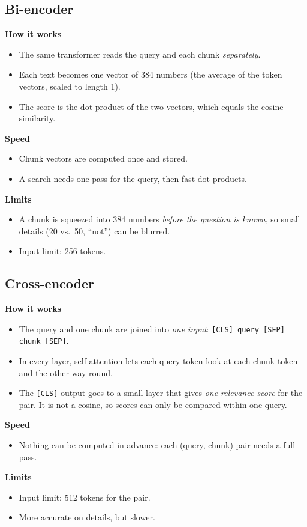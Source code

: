 \documentclass[10pt,a4paper]{article}
\newcommand{\code}[1]{\texttt{#1}}
\begin{document}
\subsection*{Bi-encoder}
\textbf{How it works}
\begin{itemize}
\item The same transformer reads the query and each chunk \emph{separately}.
\item Each text becomes one vector of 384 numbers (the average of the token vectors, scaled to length 1).
\item The score is the dot product of the two vectors, which equals the cosine similarity.
\end{itemize}
\textbf{Speed}
\begin{itemize}
\item Chunk vectors are computed once and stored.
\item A search needs one pass for the query, then fast dot products.
\end{itemize}
\textbf{Limits}
\begin{itemize}
\item A chunk is squeezed into 384 numbers \emph{before the question is known}, so small details (20 vs.\ 50, ``not'') can be blurred.
\item Input limit: 256 tokens.
\end{itemize}
\newpage
\subsection*{Cross-encoder}
\textbf{How it works}
\begin{itemize}
\item The query and one chunk are joined into \emph{one input}: \code{[CLS] query [SEP] chunk [SEP]}.
\item In every layer, self-attention lets each query token look at each chunk token and the other way round.
\item The \code{[CLS]} output goes to a small layer that gives \emph{one relevance score} for the pair. It is not a cosine, so scores can only be compared within one query.
\end{itemize}
\textbf{Speed}
\begin{itemize}
\item Nothing can be computed in advance: each (query, chunk) pair needs a full pass.
\end{itemize}
\textbf{Limits}
\begin{itemize}
\item Input limit: 512 tokens for the pair.
\item More accurate on details, but slower.
\end{itemize}
\end{document}

